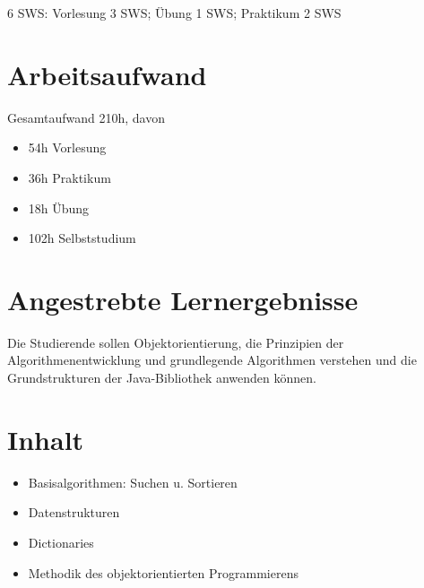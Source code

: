 6 SWS: Vorlesung 3 SWS; Übung 1 SWS; Praktikum 2 SWS

\hypertarget{arbeitsaufwandpathlabelmi-2017modulbeschreibungen-bachelorba_algorithmenundprogrammierung2}{%
\section*{Arbeitsaufwand\label{/mi-2017/modulbeschreibungen-bachelor/BA_AlgorithmenundProgrammierung2}}\label{arbeitsaufwandpathlabelmi-2017modulbeschreibungen-bachelorba_algorithmenundprogrammierung2}}

Gesamtaufwand 210h, davon

\begin{itemize}
\tightlist
\item
  54h Vorlesung
\item
  36h Praktikum
\item
  18h Übung
\item
  102h Selbststudium
\end{itemize}

\hypertarget{angestrebte-lernergebnissepathlabelmi-2017modulbeschreibungen-bachelorba_algorithmenundprogrammierung2}{%
\section*{Angestrebte
Lernergebnisse\label{/mi-2017/modulbeschreibungen-bachelor/BA_AlgorithmenundProgrammierung2}}\label{angestrebte-lernergebnissepathlabelmi-2017modulbeschreibungen-bachelorba_algorithmenundprogrammierung2}}

Die Studierende sollen Objektorientierung, die Prinzipien der
Algorithmenentwicklung und grundlegende Algorithmen verstehen und die
Grundstrukturen der Java-Bibliothek anwenden können.

\hypertarget{inhaltpathlabelmi-2017modulbeschreibungen-bachelorba_algorithmenundprogrammierung2}{%
\section*{Inhalt\label{/mi-2017/modulbeschreibungen-bachelor/BA_AlgorithmenundProgrammierung2}}\label{inhaltpathlabelmi-2017modulbeschreibungen-bachelorba_algorithmenundprogrammierung2}}

\begin{itemize}
\tightlist
\item
  Basisalgorithmen: Suchen u. Sortieren
\item
  Datenstrukturen
\item
  Dictionaries
\item
  Methodik des objektorientierten Programmierens
\end{itemize}

